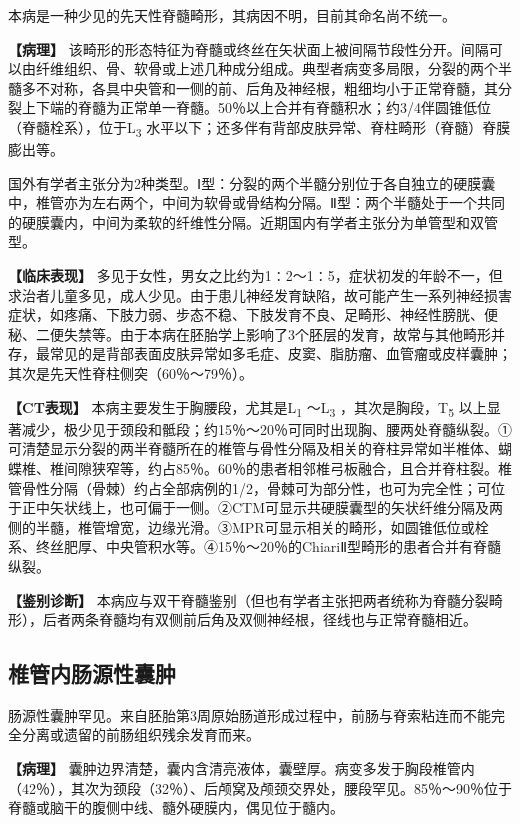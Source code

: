 本病是一种少见的先天性脊髓畸形，其病因不明，目前其命名尚不统一。

\textbf{【病理】}
该畸形的形态特征为脊髓或终丝在矢状面上被间隔节段性分开。间隔可以由纤维组织、骨、软骨或上述几种成分组成。典型者病变多局限，分裂的两个半髓多不对称，各具中央管和一侧的前、后角及神经根，粗细均小于正常脊髓，其分裂上下端的脊髓为正常单一脊髓。50％以上合并有脊髓积水；约3/4伴圆锥低位（脊髓栓系），位于L\textsubscript{3}
水平以下；还多伴有背部皮肤异常、脊柱畸形（脊髓）脊膜膨出等。

国外有学者主张分为2种类型。Ⅰ型：分裂的两个半髓分别位于各自独立的硬膜囊中，椎管亦为左右两个，中间为软骨或骨结构分隔。Ⅱ型：两个半髓处于一个共同的硬膜囊内，中间为柔软的纤维性分隔。近期国内有学者主张分为单管型和双管型。

\textbf{【临床表现】}
多见于女性，男女之比约为1∶2～1∶5，症状初发的年龄不一，但求治者儿童多见，成人少见。由于患儿神经发育缺陷，故可能产生一系列神经损害症状，如疼痛、下肢力弱、步态不稳、下肢发育不良、足畸形、神经性膀胱、便秘、二便失禁等。由于本病在胚胎学上影响了3个胚层的发育，故常与其他畸形并存，最常见的是背部表面皮肤异常如多毛症、皮窦、脂肪瘤、血管瘤或皮样囊肿；其次是先天性脊柱侧突（60％～79％）。

\textbf{【CT表现】} 本病主要发生于胸腰段，尤其是L\textsubscript{1}
～L\textsubscript{3} ，其次是胸段，T\textsubscript{5}
以上显著减少，极少见于颈段和骶段；约15％～20％可同时出现胸、腰两处脊髓纵裂。①可清楚显示分裂的两半脊髓所在的椎管与骨性分隔及相关的脊柱异常如半椎体、蝴蝶椎、椎间隙狭窄等，约占85％。60％的患者相邻椎弓板融合，且合并脊柱裂。椎管骨性分隔（骨棘）约占全部病例的1/2，骨棘可为部分性，也可为完全性；可位于正中矢状线上，也可偏于一侧。②CTM可显示共硬膜囊型的矢状纤维分隔及两侧的半髓，椎管增宽，边缘光滑。③MPR可显示相关的畸形，如圆锥低位或栓系、终丝肥厚、中央管积水等。④15％～20％的ChiariⅡ型畸形的患者合并有脊髓纵裂。

\textbf{【鉴别诊断】}
本病应与双干脊髓鉴别（但也有学者主张把两者统称为脊髓分裂畸形），后者两条脊髓均有双侧前后角及双侧神经根，径线也与正常脊髓相近。

\subsection{椎管内肠源性囊肿}

肠源性囊肿罕见。来自胚胎第3周原始肠道形成过程中，前肠与脊索粘连而不能完全分离或遗留的前肠组织残余发育而来。

\textbf{【病理】}
囊肿边界清楚，囊内含清亮液体，囊壁厚。病变多发于胸段椎管内（42％），其次为颈段（32％）、后颅窝及颅颈交界处，腰段罕见。85％～90％位于脊髓或脑干的腹侧中线、髓外硬膜内，偶见位于髓内。

